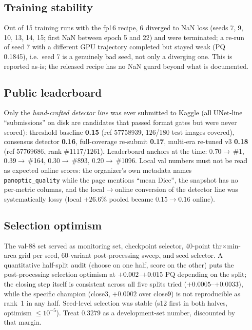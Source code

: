 \documentclass[11pt]{article}
\begin{document}
\subsection{Training stability}
Out of 15 training runs with the fp16 recipe, 6 diverged to NaN loss
(seeds 7, 9, 10, 13, 14, 15; first NaN between epoch 5 and 22) and were
terminated; a re-run of seed 7 with a different GPU trajectory completed
but stayed weak (PQ 0.1845), i.e.\ seed 7 is a genuinely bad seed, not
only a diverging one. This is reported as-is; the released recipe has no
NaN guard beyond what is documented.

\subsection{Public leaderboard}
\label{sec:lb}
Only the \emph{hand-crafted detector line} was ever submitted to Kaggle
(all UNet-line ``submissions'' on disk are candidates that passed format
gates but were never scored): threshold baseline \textbf{0.15} (ref
57758939, 126/180 test images covered), consensus detector \textbf{0.16},
full-coverage re-submit \textbf{0.17}, multi-era re-tuned v3 \textbf{0.18}
(ref 57769686, rank \#1117/1261). Leaderboard anchors at the time:
$0.70\to$\,\#1, $0.39\to$\,\#164, $0.30\to$\,\#893, $0.20\to$\,\#1096.
Local val numbers must not be read as expected online scores: the
organizer's own metadata names \texttt{panoptic\_quality} while the page
mentions ``mean Dice'', the snapshot has no per-metric columns, and the
local$\to$online conversion of the detector line was systematically lossy
(local $+26.6\%$ pooled became $0.15\to0.16$ online).

\subsection{Selection optimism}
The val-88 set served as monitoring set, checkpoint selector, 40-point
thr$\times$min-area grid per seed, 60-variant post-processing sweep, and
seed selector. A quantitative half-split audit (choose on one half, score
on the other) puts the post-processing selection optimism at
$+0.002$--$+0.015$ PQ depending on the split; the closing step itself is
consistent across all five splits tried ($+0.0005$--$+0.0033$), while the
specific champion (close3, $+0.0002$ over close9) is not reproducible as
rank~1 in any half. Seed-level selection was stable (s12 first in both
halves, optimism $\le10^{-5}$). Treat $0.3279$ as a development-set
number, discounted by that margin.
\end{document}
